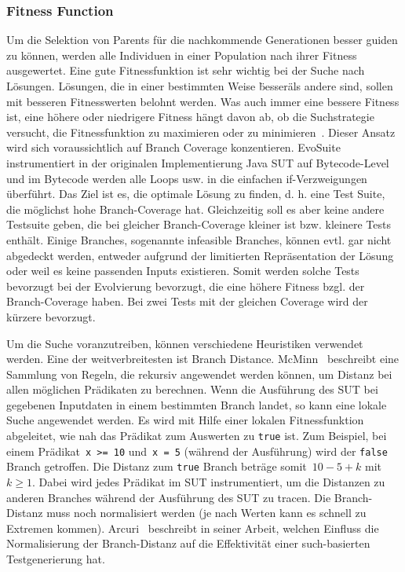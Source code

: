 \documentclass{article}
\begin{document}
\subsubsection{Fitness Function}
Um die Selektion von Parents für die nachkommende Generationen besser guiden zu können, werden alle Individuen in einer Population nach ihrer Fitness ausgewertet. Eine gute Fitnessfunktion ist sehr wichtig bei der Suche nach Lösungen. Lösungen, die in einer bestimmten Weise \"besser\" als andere sind, sollen mit besseren Fitnesswerten belohnt werden. Was auch immer eine bessere Fitness ist, eine höhere oder niedrigere Fitness hängt davon ab, ob die Suchstrategie versucht, die Fitnessfunktion zu maximieren oder zu minimieren~\cite{McMinn_2004}. Dieser Ansatz wird sich voraussichtlich auf Branch Coverage konzentieren. EvoSuite instrumentiert in der originalen Implementierung Java SUT auf Bytecode-Level und im Bytecode werden alle Loops usw. in die einfachen if-Verzweigungen überführt. Das Ziel ist es, die optimale Lösung zu finden, d. h. eine Test Suite, die möglichst hohe Branch-Coverage hat. Gleichzeitig soll es aber keine andere Testsuite geben, die bei gleicher Branch-Coverage kleiner ist bzw. kleinere Tests enthält. Einige Branches, sogenannte infeasible Branches, können evtl. gar nicht abgedeckt werden, entweder aufgrund der limitierten Repräsentation der Lösung oder weil es keine passenden Inputs existieren. Somit werden solche Tests bevorzugt bei der Evolvierung bevorzugt, die eine höhere Fitness bzgl. der Branch-Coverage haben. Bei zwei Tests mit der gleichen Coverage wird der kürzere bevorzugt.

Um die Suche voranzutreiben, können verschiedene Heuristiken verwendet werden.  Eine der weitverbreitesten ist Branch Distance. McMinn~\cite{McMinn_2004} beschreibt eine Sammlung von Regeln, die rekursiv angewendet werden können, um Distanz bei allen möglichen Prädikaten zu berechnen. Wenn die Ausführung des \ac{SUT} bei gegebenen Inputdaten in einem bestimmten Branch landet, so kann eine lokale Suche angewendet werden. Es wird mit Hilfe einer lokalen Fitnessfunktion abgeleitet, wie nah das Prädikat zum Auswerten zu \lstinline{true} ist. Zum Beispiel, bei einem Prädikat~\lstinline{x >= 10} und~\lstinline{x = 5} (während der Ausführung) wird der \lstinline{false} Branch getroffen. Die Distanz zum \lstinline{true} Branch beträge somit~$10 - 5 + k$ mit~$k \geq 1$. Dabei wird jedes Prädikat im \ac{SUT} instrumentiert, um die Distanzen zu anderen Branches während der Ausführung des \ac{SUT} zu tracen. Die Branch-Distanz muss noch normalisiert werden (je nach Werten kann es schnell zu Extremen kommen). Arcuri~\cite{Arcuri_2011} beschreibt in seiner Arbeit, welchen Einfluss die Normalisierung der Branch-Distanz auf die Effektivität einer such-basierten Testgenerierung hat.
\end{document}
